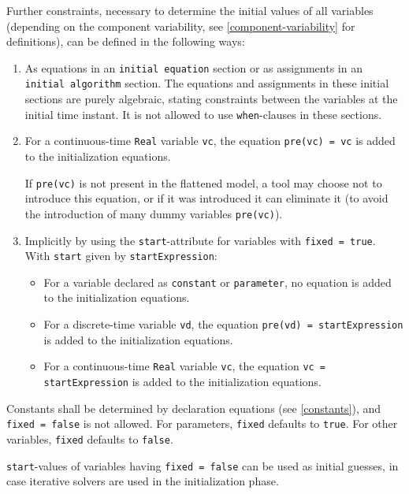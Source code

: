 Further constraints, necessary to determine the initial values of all variables (depending on the component variability, see \cref{component-variability} for definitions), can be defined in the following ways:
\begin{enumerate}
\item
  As equations in an \lstinline!initial equation! section or as assignments in an \lstinline!initial algorithm! section.
  The equations and assignments in these initial sections are purely algebraic, stating constraints between the variables at the initial time instant.
  It is not allowed to use \lstinline!when!-clauses in these sections.
\item
  For a continuous-time \lstinline!Real! variable \lstinline!vc!, the equation \lstinline!pre(vc) = vc! is added to the initialization equations.
  \begin{nonnormative}
  If \lstinline!pre(vc)! is not present in the flattened model, a tool may choose not to introduce this equation, or if it was introduced
  it can eliminate it (to avoid the introduction of many dummy variables \lstinline!pre(vc)!).
  \end{nonnormative}
\item
  Implicitly by using the \lstinline!start!-attribute for variables with \lstinline!fixed = true!.
  With \lstinline!start! given by \lstinline!startExpression!:
  \begin{itemize}
  \item
    For a variable declared as \lstinline!constant! or \lstinline!parameter!, no equation is added to the initialization equations.
  \item
    For a discrete-time variable \lstinline!vd!, the equation \lstinline!pre(vd) = startExpression! is added to the initialization equations.
  \item
    For a continuous-time \lstinline!Real! variable \lstinline!vc!, the equation \lstinline!vc = startExpression! is added to the initialization equations.
  \end{itemize}
\end{enumerate}

Constants shall be determined by declaration equations (see \cref{constants}), and \lstinline!fixed = false! is not allowed.
For parameters, \lstinline!fixed! defaults to \lstinline!true!.
For other variables, \lstinline!fixed! defaults to \lstinline!false!.

\lstinline!start!-values of variables having \lstinline!fixed = false! can be used as initial guesses, in case iterative solvers are used in the initialization phase.

